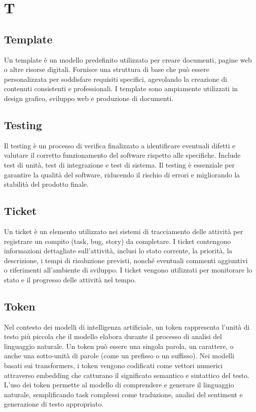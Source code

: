 \section{T}

\vspace{2em}
\subsection*{Template}
\par Un template è un modello predefinito utilizzato per creare documenti, pagine web o altre risorse digitali. Fornisce una struttura di base che può essere personalizzata per soddisfare requisiti specifici, agevolando la creazione di contenuti consistenti e professionali. I template sono ampiamente utilizzati in design grafico, sviluppo web e produzione di documenti.

\vspace{2em}
\subsection*{Testing}
\par Il testing è un processo di verifica finalizzato a identificare eventuali difetti e valutare il corretto funzionamento del software rispetto alle specifiche. Include test di unità, test di integrazione e test di sistema. Il testing è essenziale per garantire la qualità del software, riducendo il rischio di errori e migliorando la stabilità del prodotto finale.

\vspace{2em}
\subsection*{Ticket}
\par Un ticket è un elemento utilizzato nei sistemi di tracciamento delle attività per registrare un compito (task, bug, story) da completare. I ticket contengono informazioni dettagliate sull'attività, inclusi lo stato corrente, la priorità, la descrizione, i tempi di risoluzione previsti, nonché eventuali commenti aggiuntivi o riferimenti all'ambiente di sviluppo. I ticket vengono utilizzati per monitorare lo stato e il progresso delle attività nel tempo.

\vspace{2em}
\subsection*{Token}
\par Nel contesto dei modelli di intelligenza artificiale, un token rappresenta l'unità di testo più piccola che il modello elabora durante il processo di analisi del linguaggio naturale. Un token può essere una singola parola, un carattere, o anche una sotto-unità di parole (come un prefisso o un suffisso). Nei modelli basati sui transformers, i token vengono codificati come vettori numerici attraverso embedding che catturano il significato semantico e sintattico del testo. L'uso dei token permette al modello di comprendere e generare il linguaggio naturale, semplificando task complessi come traduzione, analisi del sentiment e generazione di testo appropriato.

